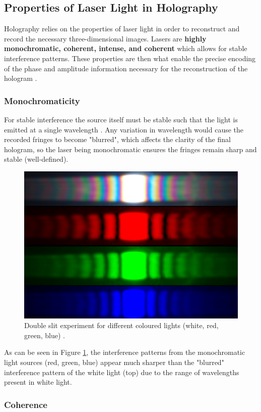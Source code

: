 \documentclass[12pt]{article}
\begin{document}
\subsection{Properties of Laser Light in Holography}

Holography relies on the properties of laser light in order to reconstruct and record the necessary three-dimensional images. Lasers are \textbf{highly monochromatic, coherent, intense, and coherent} which allows for stable
interference patterns. These properties are then what enable the precise encoding of the phase and amplitude information necessary for the reconstruction of the hologram \cite{UCDholo}.

\subsubsection{Monochromaticity} \label{sec:1.4.1}

For stable interference the source itself must be stable such that the light is emitted at a single wavelength \cite{princelaser}.
Any variation in wavelength would cause the recorded fringes to become "blurred", which affects the clarity of the final hologram, so the laser being monochromatic ensures the fringes remain sharp and stable (well-defined).

\begin{figure}[H]
    \centering
    \includegraphics[width=.5\textwidth]{interference patterns.jpg}
    \caption{\centering Double slit experiment for different coloured lights (white, red, green, blue) \protect\cite{holoimg2}.}
    \label{fig:4}
\end{figure}

As can be seen in Figure \ref{fig:4}, the interference patterns from the monochromatic light sources (red, green, blue) appear much sharper than the "blurred" interference pattern of the white light (top)
due to the range of wavelengths present in white light.

\subsubsection{Coherence} \label{sec:1.4.2}
\end{document}
